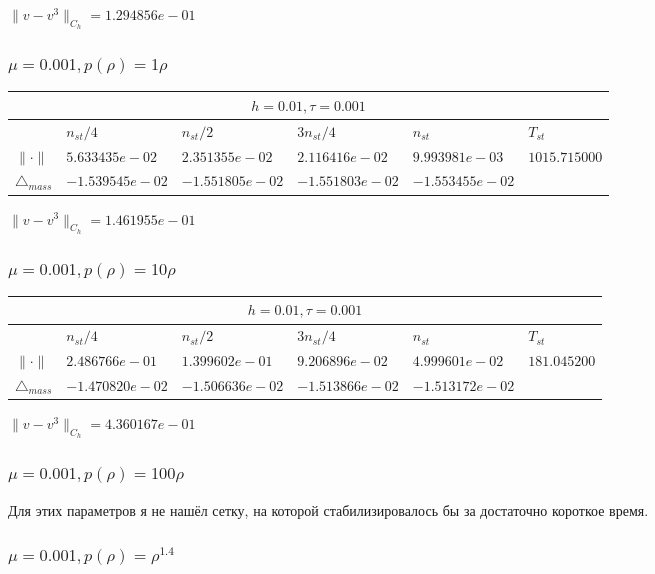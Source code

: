 $\|v-v^{3}\|_{C_h} = 1.294856e-01$

\subsubsection{$\mu = 0.001, p(\rho) = 1\rho $}

\begin{tabular}{*{6}{|l}|}
    \hline
     \\
    \hline
    &$n_{st}/4 $&$ n_{st}/2$&$3n_{st}/4$&$n_{st}$&$T_{st}$ \\
    \hline
    $\|\cdot \|$& $5.633435e-02$ & $2.351355e-02$ & $2.116416e-02$ & $9.993981e-03$ &$1015.715000$\\
\hline
$\triangle_{mass}$& $-1.539545e-02$ & $-1.551805e-02$ & $-1.551803e-02$ & $-1.553455e-02$ &\\
\hline
\end{tabular}

$\|v-v^{3}\|_{C_h} = 1.461955e-01$

\subsubsection{$\mu = 0.001, p(\rho) = 10\rho $}

\begin{tabular}{*{6}{|l}|}
    \hline
     \\
    \hline
    &$n_{st}/4 $&$ n_{st}/2$&$3n_{st}/4$&$n_{st}$&$T_{st}$ \\
    \hline
$\|\cdot \|$& $2.486766e-01$ & $1.399602e-01$ & $9.206896e-02$ & $4.999601e-02$ &$181.045200$\\
\hline
$\triangle_{mass}$& $-1.470820e-02$ & $-1.506636e-02$ & $-1.513866e-02$ & $-1.513172e-02$ &\\
\hline
\end{tabular}

$\|v-v^{3}\|_{C_h} = 4.360167e-01$

\subsubsection{$\mu = 0.001, p(\rho) = 100\rho $}
Для этих параметров я не нашёл сетку, на которой стабилизировалось бы за достаточно короткое время.

\subsubsection{$\mu = 0.001, p(\rho) = \rho^{1.4} $}

